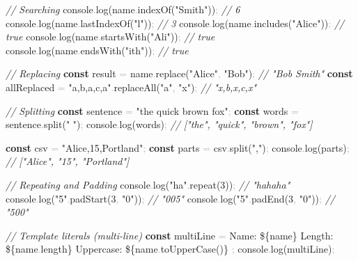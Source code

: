 \documentclass[
  justified,
  openright,
]{tufte-book}
\newcommand{\KeywordTok}[1]{\textcolor{CodeKeyword}{\textbf{#1}}}  %
\newcommand{\StringTok}[1]{\textcolor{CodeString}{#1}}              %
\newcommand{\CommentTok}[1]{\textcolor{CodeComment}{\textit{#1}}}  %
\newcommand{\CodeNumTok}[1]{\textcolor{CodeNumber}{#1}}             %
\newcommand{\CodeFuncTok}[1]{\textcolor{CodeKeyword}{#1}}           %
\newcommand{\CodeTypeTok}[1]{\textcolor{CodeType}{#1}}              %
\newcommand{\OperatorTok}[1]{\textcolor{DarkGray}{#1}}              %
\newenvironment{Shaded}{%
  \begin{mdframed}[style=TufteCode]%
}{%
  \end{mdframed}%
}
\begin{document}
\begin{Shaded}
\begin{Highlighting}[]
\CommentTok{// Searching}
console\OperatorTok{.}\CodeFuncTok{log}(name\OperatorTok{.}\CodeFuncTok{indexOf}(\StringTok{"Smith"}))\OperatorTok{;} \CommentTok{// 6}
console\OperatorTok{.}\CodeFuncTok{log}(name\OperatorTok{.}\CodeFuncTok{lastIndexOf}(\StringTok{"l"}))\OperatorTok{;} \CommentTok{// 3}
console\OperatorTok{.}\CodeFuncTok{log}(name\OperatorTok{.}\CodeFuncTok{includes}(\StringTok{"Alice"}))\OperatorTok{;} \CommentTok{// true}
console\OperatorTok{.}\CodeFuncTok{log}(name\OperatorTok{.}\CodeFuncTok{startsWith}(\StringTok{"Ali"}))\OperatorTok{;} \CommentTok{// true}
console\OperatorTok{.}\CodeFuncTok{log}(name\OperatorTok{.}\CodeFuncTok{endsWith}(\StringTok{"ith"}))\OperatorTok{;} \CommentTok{// true}
 
\CommentTok{// Replacing}
\KeywordTok{const} result \OperatorTok{=} name\OperatorTok{.}\CodeFuncTok{replace}(\StringTok{"Alice"}\OperatorTok{,} \StringTok{"Bob"})\OperatorTok{;} \CommentTok{// "Bob Smith"}
\KeywordTok{const} allReplaced \OperatorTok{=} \StringTok{"a,b,a,c,a"}\OperatorTok{.}\CodeFuncTok{replaceAll}(\StringTok{"a"}\OperatorTok{,} \StringTok{"x"})\OperatorTok{;} \CommentTok{// "x,b,x,c,x"}
 
\CommentTok{// Splitting}
\KeywordTok{const} sentence \OperatorTok{=} \StringTok{"the quick brown fox"}\OperatorTok{;}
\KeywordTok{const} words \OperatorTok{=} sentence\OperatorTok{.}\CodeFuncTok{split}(\StringTok{" "})\OperatorTok{;}
console\OperatorTok{.}\CodeFuncTok{log}(words)\OperatorTok{;} \CommentTok{// ["the", "quick", "brown", "fox"]}
 
\KeywordTok{const} csv \OperatorTok{=} \StringTok{"Alice,15,Portland"}\OperatorTok{;}
\KeywordTok{const} parts \OperatorTok{=} csv\OperatorTok{.}\CodeFuncTok{split}(\StringTok{","})\OperatorTok{;}
console\OperatorTok{.}\CodeFuncTok{log}(parts)\OperatorTok{;} \CommentTok{// ["Alice", "15", "Portland"]}
 
\CommentTok{// Repeating and Padding}
console\OperatorTok{.}\CodeFuncTok{log}(\StringTok{"ha"}\OperatorTok{.}\CodeFuncTok{repeat}(\CodeNumTok{3}))\OperatorTok{;} \CommentTok{// "hahaha"}
console\OperatorTok{.}\CodeFuncTok{log}(\StringTok{"5"}\OperatorTok{.}\CodeFuncTok{padStart}(\CodeNumTok{3}\OperatorTok{,} \StringTok{"0"}))\OperatorTok{;} \CommentTok{// "005"}
console\OperatorTok{.}\CodeFuncTok{log}(\StringTok{"5"}\OperatorTok{.}\CodeFuncTok{padEnd}(\CodeNumTok{3}\OperatorTok{,} \StringTok{"0"}))\OperatorTok{;} \CommentTok{// "500"}
 
\CommentTok{// Template literals (multi{-}line)}
\KeywordTok{const} multiLine \OperatorTok{=} \StringTok{\textasciigrave{}}
\StringTok{Name: }\StringTok{\$\{}name\StringTok{\}}
\StringTok{Length: }\StringTok{\$\{}name\OperatorTok{.}\CodeTypeTok{length}\StringTok{\}}
\StringTok{Uppercase: }\StringTok{\$\{}name\OperatorTok{.}\CodeFuncTok{toUpperCase}()\StringTok{\}}
\StringTok{\textasciigrave{}}\OperatorTok{;}
console\OperatorTok{.}\CodeFuncTok{log}(multiLine)\OperatorTok{;}
\end{Highlighting}
\end{Shaded}
\end{document}
